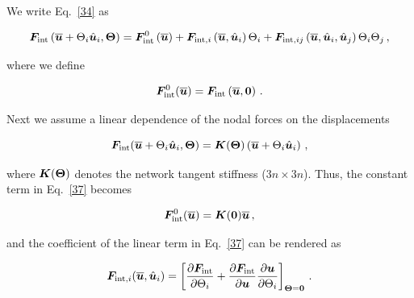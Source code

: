 \documentclass[preprint,12pt]{elsarticle}
\newcommand{\mbs}[1]{\boldsymbol{#1}}
\def \Tet {\mbs{\Theta}}
\def    \obu {{\overline{\bu}}}
\def    \hbu {{\hat{\bu}_i}}
\def    \hbv {{\hat{\bu}_j}}
\begin{document}
We write Eq.~\eqref{34} as
\begin{linenomath}
\begin{equation}\label{37}
    \bF_{\rm int} \left( \obu + \Theta_i \hbu, \Tet \right) 
    =
    \bF^0_{\rm int} \left( \obu \right)
    +
    \bF_{{\rm int},i} \left( \obu, \hbu \right) \Theta_i
    +
    \bF_{{\rm int},ij} \left( \obu, \hbu, \hbv \right)
    \Theta_i \Theta_j \,,
\end{equation}
\end{linenomath}
where we define
\begin{linenomath}
\begin{equation}\label{38}
    \bF^0_{\rm int} (\obu) = \bF_{\rm int} \left( \obu , \b0 \right) \, .
\end{equation}
\end{linenomath}

Next we assume a linear dependence of the nodal forces on the displacements
\begin{linenomath}
\begin{equation}\label{39}
    \bF_{\rm int}(\obu + \Theta_i \hbu, \Tet) = \bK (\Tet)  
    \left(\obu +\Theta_i \hbu\right)  \,,
\end{equation}
\end{linenomath}
where $\bK(\Tet)$ denotes the network tangent stiffness ($3n \times 3n$). Thus, the constant term in Eq.~\eqref{37} becomes
\begin{linenomath}
\begin{equation}\label{40}
    \bF^0_{\rm int} (\obu) = \bK(\b0) \obu \, ,
\end{equation}
\end{linenomath}
and the coefficient of the linear term in Eq.~\eqref{37} can be rendered as
\begin{linenomath}
\begin{equation}\label{41}
    \bF_{{\rm int},i} (\obu, \hbu) =
    \left[ 
    \frac{\partial \bF_{\rm int}}{\partial \Theta_i}
    +
    \frac{\partial \bF_{\rm int}}{\partial \bu}
    \frac{\partial \bu}{\partial \Theta_i}
    \right]_{\Tet=\b0} \, .
\end{equation}
\end{linenomath}
\end{document}
